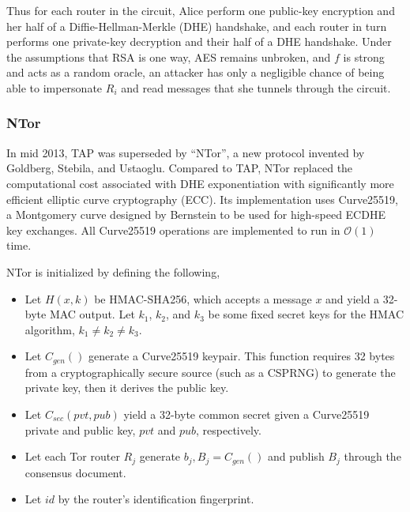 Thus for each router in the circuit, Alice perform one public-key encryption and her half of a Diffie-Hellman-Merkle (DHE) handshake, and each router in turn performs one private-key decryption and their half of a DHE handshake. Under the assumptions that RSA is one way, AES remains unbroken, and $ f $ is strong and acts as a random oracle, an attacker has only a negligible chance of being able to impersonate $ R_{i} $ and read messages that she tunnels through the circuit.\cite{goldberg2006security}

\subsubsection{NTor}


In mid 2013, TAP was superseded by ``NTor'', a new protocol invented by Goldberg, Stebila, and Ustaoglu.\cite{goldberg2013anonymity} Compared to TAP, NTor replaced the computational cost associated with DHE exponentiation with significantly more efficient elliptic curve cryptography (ECC). Its implementation uses Curve25519,\cite{bernstein2006curve25519} a Montgomery curve designed by Bernstein to be used for high-speed ECDHE key exchanges. All Curve25519 operations are implemented to run in $ \mathcal{O}(1) $ time.

NTor is initialized by defining the following,

\begin{itemize}
	\item Let $ H(x,k) $ be HMAC-SHA256, which accepts a message $ x $ and yield a 32-byte MAC output. Let $ k_{1} $, $ k_{2} $, and $ k_{3} $ be some fixed secret keys for the HMAC algorithm, $ k_{1} \neq k_{2} \neq k_{3} $.
	\item Let $ \mathit{C}_{\mathit{gen}}() $ generate a Curve25519 keypair. This function requires 32 bytes from a cryptographically secure source (such as a CSPRNG) to generate the private key, then it derives the public key.
	\item Let $ \mathit{C}_{\mathit{sec}}(pvt, pub) $ yield a 32-byte common secret given a Curve25519 private and public key, $ pvt $ and $ pub $, respectively.
	\item Let each Tor router $ R_{j} $ generate $ b_{j},B_{j} = \mathit{C}_{\mathit{gen}}() $ and publish $ B_{j} $ through the consensus document.
	\item Let $ \mathit{id} $ by the router's identification fingerprint.
\end{itemize}

